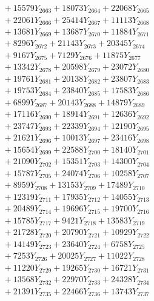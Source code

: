 \documentclass[a4paper,10pt]{article}
\begin{document}
{\begin{align}
&\;  + 15579 Y_{2663} + 18073 Y_{2664} + 22068 Y_{2665} \\[0.3ex]
&\;  + 22061 Y_{2666} + 25414 Y_{2667} + 11113 Y_{2668} \\[0.5ex]\allowbreak
&\;  + 13681 Y_{2669} + 13687 Y_{2670} + 11884 Y_{2671} \\[0.3ex]
&\;  + 8296 Y_{2672} + 21143 Y_{2673} + 20345 Y_{2674} \\[0.3ex]
&\;  + 9167 Y_{2675} + 7129 Y_{2676} + 11875 Y_{2677} \\[0.3ex]
&\;  + 13342 Y_{2678} + 20598 Y_{2679} + 23072 Y_{2680} \\[0.3ex]
&\;  + 19761 Y_{2681} + 20138 Y_{2682} + 23807 Y_{2683} \\[0.3ex]
&\;  + 19753 Y_{2684} + 23840 Y_{2685} + 17583 Y_{2686} \\[0.3ex]
&\;  + 6899 Y_{2687} + 20143 Y_{2688} + 14879 Y_{2689} \\[0.3ex]
&\;  + 17116 Y_{2690} + 18914 Y_{2691} + 12636 Y_{2692} \\[0.3ex]
&\;  + 23747 Y_{2693} + 22339 Y_{2694} + 12190 Y_{2695} \\[0.3ex]
&\;  + 21621 Y_{2696} + 10013 Y_{2697} + 23416 Y_{2698} \\[0.5ex]\allowbreak
&\;  + 15654 Y_{2699} + 22588 Y_{2700} + 18140 Y_{2701} \\[0.3ex]
&\;  + 21090 Y_{2702} + 15351 Y_{2703} + 14300 Y_{2704} \\[0.3ex]
&\;  + 15787 Y_{2705} + 24074 Y_{2706} + 10258 Y_{2707} \\[0.3ex]
&\;  + 8959 Y_{2708} + 13153 Y_{2709} + 17489 Y_{2710} \\[0.3ex]
&\;  + 12319 Y_{2711} + 17935 Y_{2712} + 14055 Y_{2713} \\[0.3ex]
&\;  + 20489 Y_{2714} + 19696 Y_{2715} + 19700 Y_{2716} \\[0.3ex]
&\;  + 15785 Y_{2717} + 9421 Y_{2718} + 13583 Y_{2719} \\[0.3ex]
&\;  + 21728 Y_{2720} + 20790 Y_{2721} + 10929 Y_{2722} \\[0.3ex]
&\;  + 14149 Y_{2723} + 23640 Y_{2724} + 6758 Y_{2725} \\[0.3ex]
&\;  + 7253 Y_{2726} + 20025 Y_{2727} + 11022 Y_{2728} \\[0.5ex]\allowbreak
&\;  + 11220 Y_{2729} + 19265 Y_{2730} + 16721 Y_{2731} \\[0.3ex]
&\;  + 13568 Y_{2732} + 22970 Y_{2733} + 24328 Y_{2734} \\[0.3ex]
&\;  + 21391 Y_{2735} + 22466 Y_{2736} + 13743 Y_{2737} \\[0.3ex]

\end{align}}
\end{document}
